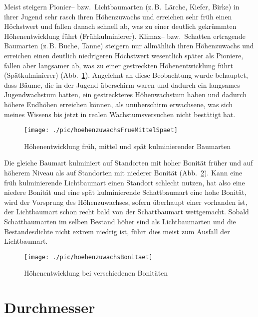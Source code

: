 \documentclass[twocolumn]{scrartcl}
\begin{document}
Meist steigern Pionier-- bzw.\ Lichtbaumarten (z.\,B.\ Lärche, Kiefer, Birke) in
ihrer Jugend sehr rasch ihren Höhenzuwachs und erreichen sehr früh einen
Höchstwert und fallen danach schnell ab, was zu einer deutlich gekrümmten
Höhenentwicklung führt (Frühkulminierer). Klimax-- bzw.\ Schatten ertragende
Baumarten (z.\,B. Buche, Tanne) steigern nur allmählich ihren Höhenzuwachs und
erreichen einen deutlich niedrigeren Höchstwert wesentlich später als Pioniere,
fallen aber langsamer ab, was zu einer gestreckten Höhenentwicklung führt
(Spätkulminierer) (Abb.~\ref{fig:hoeheFrueMittelSpaet}). Angelehnt an diese
Beobachtung wurde behauptet, dass Bäume, die in der Jugend überschirm waren und
dadurch ein langsames Jugendwachstum hatten, ein gestreckteres Höhenwachstum
haben und dadurch höhere Endhöhen erreichen können, als unüberschirm erwachsene,
was sich meines Wissens bis jetzt in realen Wachstumsversuchen nicht bestätigt
hat.

\begin{figure}[htbp]
  \centering
  \texttt{[image: ./pic/hoehenzuwachsFrueMittelSpaet]}
  \caption{Höhenentwicklung früh, mittel und spät kulminierender Baumarten}
  \label{fig:hoeheFrueMittelSpaet}
\end{figure}

Die gleiche Baumart kulminiert auf Standorten mit hoher Bonität früher und auf
höherem Niveau als auf Standorten mit niederer Bonität
(Abb.~\ref{fig:hoeheAlterBonitaeten}). Kann eine früh kulminierende Lichtbaumart
einen Standort schlecht nutzen, hat also eine niedere Bonität und eine spät
kulminierende Schattbaumart eine hohe Bonität, wird der Vorsprung des
Höhenzuwachses, sofern überhaupt einer vorhanden ist, der Lichtbaumart schon
recht bald von der Schattbaumart wettgemacht. Sobald Schattbaumarten im selben
Bestand höher sind als Lichtbaumarten und die Bestandesdichte nicht extrem
niedrig ist, führt dies meist zum Ausfall der Lichtbaumart.

\begin{figure}[htbp]
  \centering
  \texttt{[image: ./pic/hoehenzuwachsBonitaet]}
  \caption{Höhenentwicklung bei verschiedenen Bonitäten}
  \label{fig:hoeheAlterBonitaeten}
\end{figure}


\section{Durchmesser}
\end{document}
